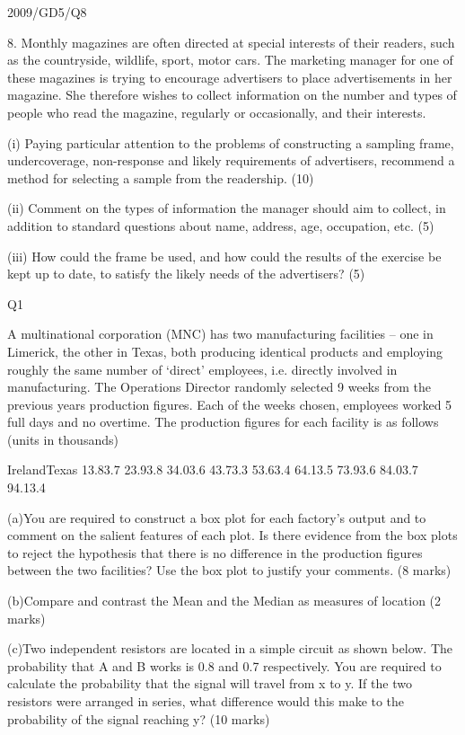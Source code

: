 2009/GD5/Q8

8. Monthly magazines are often directed at special interests of their readers, such as the countryside, wildlife, sport, motor cars. The marketing manager for one of these magazines is trying to encourage advertisers to place advertisements in her magazine. She therefore wishes to collect information on the number and types of people who read the magazine, regularly or occasionally, and their interests.

(i) Paying particular attention to the problems of constructing a sampling frame, undercoverage, non-response and likely requirements of advertisers, recommend a method
for selecting a sample from the readership. (10)

(ii) Comment on the types of information the manager should aim to collect, in addition to standard questions about name, address, age, occupation, etc. (5)

(iii) How could the frame be used, and how could the results of the exercise be kept up to date, to satisfy the likely needs of the advertisers? (5)





Q1

A multinational corporation (MNC) has two manufacturing facilities – one in Limerick, the other in Texas, both producing identical products and employing roughly the same number of ‘direct’ employees, i.e. directly involved in manufacturing.  The Operations Director randomly selected 9 weeks from the previous years production figures.  Each of the weeks chosen, employees worked 5 full days and no overtime.  The production figures for each facility is as follows (units in thousands)


IrelandTexas
13.83.7
23.93.8
34.03.6
43.73.3
53.63.4
64.13.5
73.93.6
84.03.7
94.13.4


(a)You are required to construct a box plot for each factory’s output and to comment on the salient features of each plot.  Is there evidence from the box plots to reject the hypothesis that there is no difference in the production figures between the two facilities?  Use the box plot to justify your comments. (8 marks)

(b)Compare and contrast the Mean and the Median as measures of location
(2 marks)

(c)Two independent resistors are located in a simple circuit as shown below.  The probability that A and B works is 0.8 and 0.7 respectively.  You are required to calculate the probability that the signal will travel from x to y.  If the two resistors were arranged in series, what difference would this make to the probability of the signal reaching y?
(10 marks)








